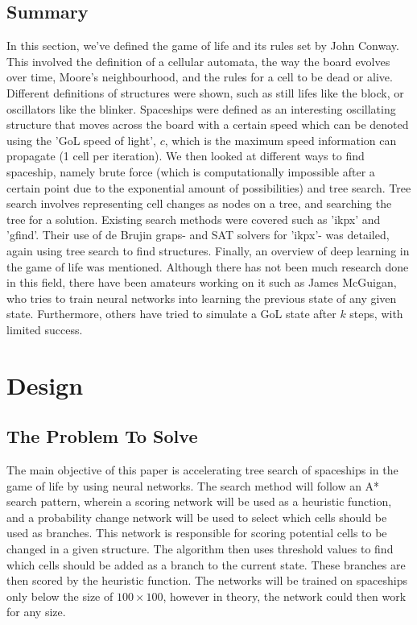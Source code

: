 \documentclass{l4proj}
\begin{document}
\section{Summary}

In this section, we've defined the game of life and its rules set by John Conway. This involved the definition of a cellular automata, the way the board evolves over time, Moore's neighbourhood, and the rules for a cell to be dead or alive. Different definitions of structures were shown, such as still lifes like the block, or oscillators like the blinker. Spaceships were defined as an interesting oscillating structure that moves across the board with a certain speed which can be denoted using the 'GoL speed of light', $c$, which is the maximum speed information can propagate (1 cell per iteration). We then looked at different ways to find spaceship, namely brute force (which is computationally impossible after a certain point due to the exponential amount of possibilities) and tree search. Tree search involves representing cell changes as nodes on a tree, and searching the tree for a solution. Existing search methods were covered such as 'ikpx' and 'gfind'. Their use of de Brujin graps- and SAT solvers for 'ikpx'- was detailed, again using tree search to find structures. Finally, an overview of deep learning in the game of life was mentioned. Although there has not been much research done in this field, there have been amateurs working on it such as James McGuigan, who tries to train neural networks into learning the previous state of any given state. Furthermore, others have tried to simulate a GoL state after $k$ steps, with limited success.

\chapter{Design}

\section{The Problem To Solve}

The main objective of this paper is accelerating tree search of spaceships in the game of life by using neural networks. The search method will follow an A* search pattern, wherein a scoring network will be used as a heuristic function, and a probability change network will be used to select which cells should be used as branches. This network is responsible for scoring potential cells to be changed in a given structure. The algorithm then uses threshold values to find which cells should be added as a branch to the current state. These branches are then scored by the heuristic function. The networks will be trained on spaceships only below the size of $100 \times 100$, however in theory, the network could then work for any size.
\end{document}
